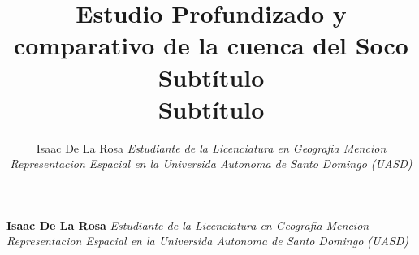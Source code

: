 \documentclass[11pt,]{article}
\title{Estudio Profundizado y comparativo de la cuenca del Soco\\
Subtítulo\\
Subtítulo  }
\author{\Large Isaac De La Rosa\vspace{0.05in} \newline\normalsize\emph{Estudiante de la Licenciatura en Geografia Mencion Representacion
Espacial en la Universida Autonoma de Santo Domingo (UASD)}  }
\date{}
\newcommand*{\authorfont}{\fontfamily{phv}\selectfont}
\begin{document}
	
%

{%
\setlength{\parindent}{0pt}
\thispagestyle{plain}
{\fontsize{18}{20}\selectfont\raggedright 
\maketitle  %

}

{
   \vskip 13.5pt\relax \normalsize\fontsize{11}{12} 
\textbf{\authorfont Isaac De La Rosa} \hskip 15pt \emph{\small Estudiante de la Licenciatura en Geografia Mencion Representacion
Espacial en la Universida Autonoma de Santo Domingo (UASD)}   

}

}
\end{document}
